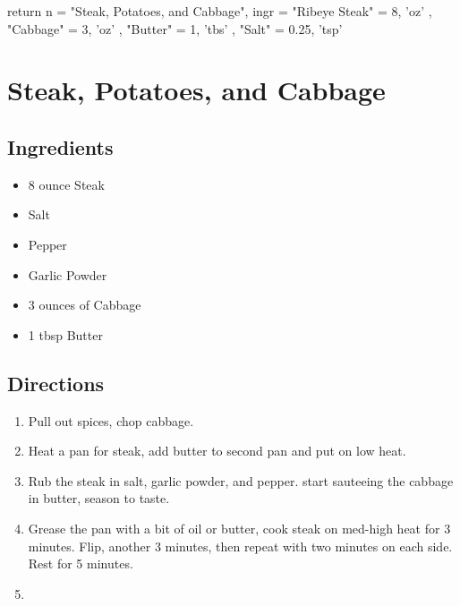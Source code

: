 return {
  n = "Steak, Potatoes, and Cabbage",
  ingr = { 
    "Ribeye Steak" = { 8, 'oz' },
    "Cabbage" = { 3, 'oz' },
    "Butter" = { 1, 'tbs' },
    "Salt" = { 0.25, 'tsp' }
  }
}


\section{ Steak, Potatoes, and Cabbage }

\subsection{ Ingredients }

\begin{itemize}
  \item 8 ounce Steak
  \item Salt
  \item Pepper
  \item Garlic Powder
  \item 3 ounces of Cabbage
  \item 1 tbsp Butter
\end{itemize}

\subsection{ Directions }

\begin{enumerate}
  \item Pull out spices, chop cabbage. 
  \item Heat a pan for steak, add butter to second pan and put on low heat. 
  \item Rub the steak in salt, garlic powder, and pepper. start sauteeing the cabbage in butter, season to taste. 
  \item Grease the pan with a bit of oil or butter, cook steak on med-high heat for 3 minutes. Flip, another 3 minutes, then repeat with two minutes on each side. Rest for 5 minutes. 
  \item 
\end{enumerate}

